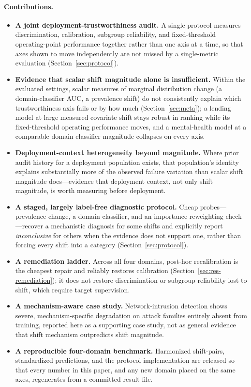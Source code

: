 \documentclass[11pt]{article}
\begin{document}
\paragraph{Contributions.}
\begin{itemize}
  \item \textbf{A joint deployment-trustworthiness audit.} A single protocol measures
  discrimination, calibration, subgroup reliability, and fixed-threshold operating-point
  performance together rather than one axis at a time, so that axes shown to move independently are
  not missed by a single-metric evaluation (Section~\ref{sec:protocol}).
  \item \textbf{Evidence that scalar shift magnitude alone is insufficient.} Within the evaluated
  settings, scalar measures of marginal distribution change (a domain-classifier AUC, a prevalence
  shift) do not consistently explain which trustworthiness axis fails or by how much
  (Section~\ref{sec:meta}); a lending model at large measured covariate shift stays robust in
  ranking while its fixed-threshold operating performance moves, and a mental-health model at a
  comparable domain-classifier magnitude collapses on every axis.
  \item \textbf{Deployment-context heterogeneity beyond magnitude.} Where prior audit history for a
  deployment population exists, that population's identity explains substantially more of the
  observed failure variation than scalar shift magnitude does---evidence that deployment context,
  not only shift magnitude, is worth measuring before deployment.
  \item \textbf{A staged, largely label-free diagnostic protocol.} Cheap probes---prevalence
  change, a domain classifier, and an importance-reweighting check---recover a mechanistic
  diagnosis for some shifts and explicitly report \emph{inconclusive} for others when the evidence
  does not support one, rather than forcing every shift into a category
  (Section~\ref{sec:protocol}).
  \item \textbf{A remediation ladder.} Across all four domains, post-hoc recalibration is the
  cheapest repair and reliably restores calibration (Section~\ref{sec:res-remediation}); it does
  not restore discrimination or subgroup reliability lost to shift, which require target
  supervision.
  \item \textbf{A mechanism-aware case study.} Network-intrusion detection shows severe,
  mechanism-specific degradation on attack families entirely absent from training, reported here as
  a supporting case study, not as general evidence that shift mechanism outpredicts shift
  magnitude.
  \item \textbf{A reproducible four-domain benchmark.} Harmonized shift-pairs, standardized
  predictions, and the protocol implementation are released so that every number in this paper, and
  any new domain placed on the same axes, regenerates from a committed result file.
\end{itemize}
\end{document}
